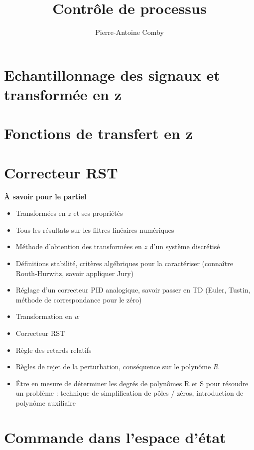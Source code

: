 \documentclass{../../cours}
\title{Contrôle de processus}
\author{Pierre-Antoine Comby}
\begin{document}
\maketitle
\tableofcontents


\chapter{Echantillonnage des signaux et transformée en z}

\chapter{Fonctions de transfert en z}


\chapter{Correcteur RST}

\newpage
\textbf{À savoir pour le partiel}
\begin{itemize}
\item Transformées en $z$ et ses propriétés
\item Tous les résultats sur les filtres linéaires numériques
\item Méthode d'obtention des transformées en $z$ d'un système discrétisé
\item Définitions stabilité, critères algébriques pour la caractériser (connaître Routh-Hurwitz, savoir appliquer Jury)
\item Réglage d'un correcteur PID analogique, savoir passer en TD (Euler, Tustin, méthode de correspondance pour le zéro)
\item Transformation en $w$
\item Correcteur RST
\item Règle des retards relatifs
\item Règles de rejet de la perturbation, conséquence sur le polynôme $R$
\item Être en mesure de déterminer les degrés de polynômes R et S pour résoudre un problème : technique de simplification de pôles / zéros, introduction de polynôme auxiliaire
\end{itemize}

\chapter{Commande dans l'espace d'état}

\end{document}
